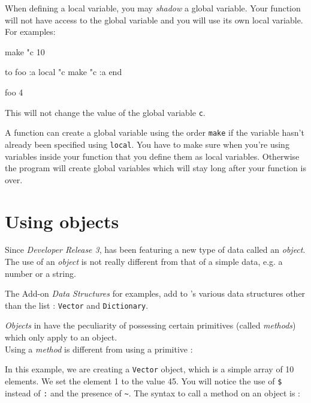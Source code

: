 When defining a local variable, you may {\em shadow} a global variable. Your function will not have access to the global variable and you will use its own local variable. For examples: 
 
\begin{verbatimtab}
make "c 10 

to foo :a
	local "c
	make "c :a
end

foo 4 
\end{verbatimtab} 
 
This will not change the value of the global variable {\tt c}. 
 
A function can create a global variable using the order {\tt make} if the variable hasn't already been specified using {\tt local}. You have to make sure when you're using variables inside your function that you define them as local variables.  Otherwise the program will create global variables which will stay long after your function is over.

\section{Using objects}

Since {\em Developer Release 3}, \squirrel has been featuring a new type of data called an {\em object}. The use of an {\em object} is not really different from that of a simple data, e.g. a number or a string.

The Add-on {\em Data Structures} for examples, add to \squirrel's various data structures other than the list : {\tt Vector} and {\tt Dictionary}.   

{\em Objects} in \squirrel have the peculiarity of possessing certain primitives (called {\em methods}) which only apply to an object.\\
 
Using a {\em method} is different from using a primitive : 


In this example, we are creating a {\tt Vector} object, which is a simple array of 10 elements.  We set the element 1 to the value 45. You will notice the use of {\tt \$} instead of {\tt :} and the presence of {\tt \verb+~+}. The syntax to call a method on an object is : \\

